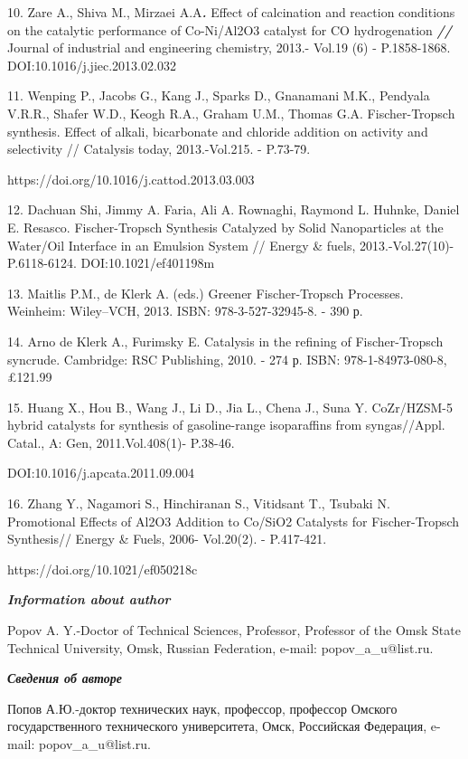 \begin{noparindent}
10. Zare A., Shiva M., Mirzaei A.A\emph{{\bfseries .}} Effect of
calcination and reaction conditions on the catalytic performance of
Co-Ni/Al2O3 catalyst for CO hydrogenation \emph{{\bfseries //}} Journal of
industrial and engineering chemistry, 2013.- Vol.19 (6) - P.1858-1868.
DOI:10.1016/j.jiec.2013.02.032

11. Wenping P., Jacobs G., Kang J., Sparks D., Gnanamani M.K., Pendyala
V.R.R., Shafer W.D., Keogh R.A., Graham U.M., Thomas G.A.
Fischer-Tropsch synthesis. Effect of alkali, bicarbonate and chloride
addition on activity and selectivity // Catalysis today, 2013.-Vol.215.
- P.73-79.

https://doi.org/10.1016/j.cattod.2013.03.003

12. Dachuan Shi, Jimmy A. Faria, Ali A. Rownaghi, Raymond L. Huhnke,
Daniel E. Resasco. Fischer-Tropsch Synthesis Catalyzed by Solid
Nanoparticles at the Water/Oil Interface in an Emulsion System
// Energy \& fuels, 2013.-Vol.27(10)- P.6118-6124.
DOI:10.1021/ef401198m

13. Maitlis P.M., de Klerk A. (eds.) Greener Fischer-Tropsch Processes.
Weinheim: Wiley--VCH, 2013. ISBN: 978-3-527-32945-8. - 390 р.

14. Arno de Klerk A., Furimsky E. Catalysis in the refining of
Fischer-Tropsch syncrude. Cambridge: RSC Publishing, 2010. - 274 р.
ISBN: 978-1-84973-080-8, £121.99

15. Huang X., Hou B., Wang J., Li D., Jia L., Chena J., Suna Y.
CoZr/HZSM-5 hybrid catalysts for synthesis of gasoline-range
isoparaffins from syngas//Appl. Catal., A: Gen, 2011.Vol.408(1)-
P.38-46.

DOI:10.1016/j.apcata.2011.09.004

16. Zhang Y., Nagamori S., Hinchiranan S., Vitidsant T., Tsubaki N.
Promotional Effects of Al2O3 Addition to Co/SiO2 Catalysts for
Fischer-Tropsch Synthesis// Energy \& Fuels, 2006- Vol.20(2). -
P.417-421.

https://doi.org/10.1021/ef050218c
\end{noparindent}

\emph{{\bfseries Information about author}}

\begin{noparindent}
Popov A. Y.-Doctor of Technical Sciences, Professor, Professor of the
Omsk State Technical University, Omsk, Russian Federation, e-mail:
popov\_a\_u@list.ru.
\end{noparindent}

\emph{{\bfseries Сведения об авторе}}

\begin{noparindent}
Попов А.Ю.-доктор технических наук, профессор, профессор Омского
государственного технического университета, Омск, Российская Федерация,
e-mail: popov\_a\_u@list.ru.
\end{noparindent}

